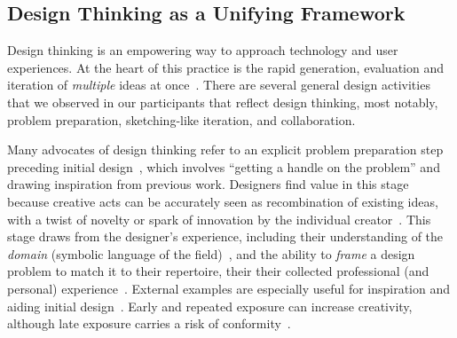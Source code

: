 
\subsection{Design Thinking as a Unifying Framework}
\noindent Design thinking is %
an empowering way to approach technology and user experiences.
At the heart of this practice is the rapid generation, evaluation and iteration of \textit{multiple} ideas at once~\citep{Buxton2007}. %
There are several general design activities that we observed in our participants that reflect design thinking, most notably, problem preparation, sketching-like iteration, and collaboration.

Many advocates of design thinking refer to an explicit problem preparation step preceding initial design~\citep{Schon1982,Warr2005,Shneiderman2000}, 
which involves ``getting a handle on the problem'' and drawing inspiration from previous work.
Designers find value in this stage because creative acts can be accurately seen as recombination of existing ideas, with a twist of novelty or spark of innovation by the individual creator~\citep{Warr2005}.
This stage draws from the designer's experience, including their understanding of the \emph{domain} (symbolic language of the field)~\citep{Csikszentmihalyi1996}, and the ability to \textit{frame} a design problem to match it to their repertoire, their their collected professional (and personal) experience~\citep{Schon1982}.
External examples are especially useful for inspiration and aiding initial design~\citep{Herring2009,Buxton2007}.
Early and repeated exposure can increase creativity, although late exposure carries a risk of conformity~\citep{Kulkarni2014}.

